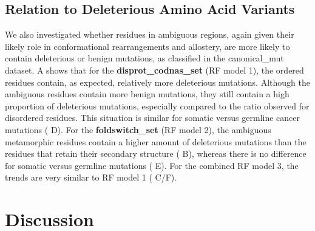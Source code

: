 \subsection{Relation to Deleterious Amino Acid Variants}
We also investigated whether residues in ambiguous regions, again given their likely role in conformational rearrangements and allostery, are more likely to contain deleterious or benign mutations, as classified in the canonical_mut dataset. A shows that for the \textbf{disprot_codnas_set} (RF model 1), the ordered residues contain, as expected, relatively more deleterious mutations. Although the ambiguous residues contain more benign mutations, they still contain a high proportion of deleterious mutations, especially compared to the ratio observed for disordered residues. This situation is similar for somatic versus germline cancer mutations ( D). For the \textbf{foldswitch_set} (RF model 2), the ambiguous metamorphic residues contain a higher amount of deleterious mutations than the residues that retain their secondary structure ( B), whereas there is no difference for somatic versus germline mutations ( E). For the combined RF model 3, the trends are very similar to RF model 1 ( C/F).


\section{Discussion}


